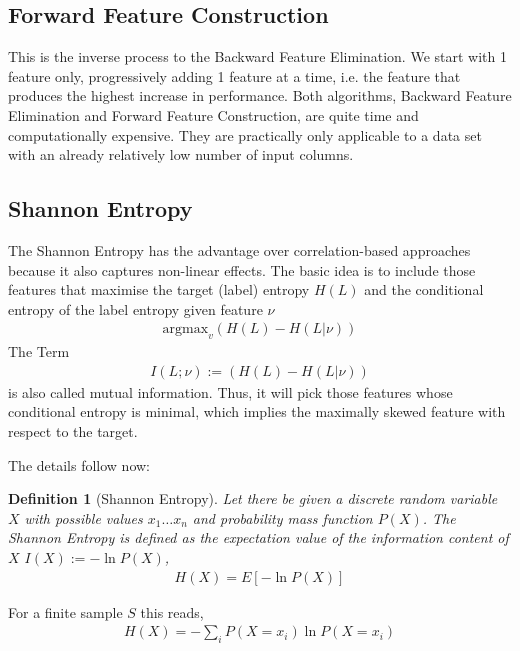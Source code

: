 \documentclass[10pt,a4paper]{article}
\newtheorem{definition}{Definition}
\begin{document}
\subsection*{Forward Feature Construction}
This is the inverse process to the Backward Feature Elimination. We start with 1 feature only, progressively adding 1 feature at a time, i.e. the feature that produces the highest increase in performance. Both algorithms, Backward Feature Elimination and Forward Feature Construction, are quite time and computationally expensive. They are practically only applicable to a data set with an already relatively low number of input columns.

\subsection*{Shannon Entropy}
The Shannon Entropy has the advantage over correlation-based approaches because it also captures non-linear effects. The basic idea is to include those features that maximise the target (label) entropy $H(L)$ and the conditional entropy of the  label entropy given feature $\nu$
\begin{align}
\text{argmax}_v\left( H(L) - H(L|\nu)\right)
\end{align}
The Term 
\begin{align}
I(L;\nu) :=\left( H(L) - H(L|\nu)\right)
\end{align}
is also called mutual information.
Thus, it will pick those features whose conditional entropy is minimal, which implies the maximally skewed feature with respect to the target. 


The details follow now:
\begin{definition}[Shannon Entropy]
Let there be given a discrete random variable $X$ with possible values ${x_1\dots x_n}$ and probability mass function $P(X)$. The Shannon Entropy is defined as the expectation value of the information content of $X$ $I(X):=-\ln P(X)$,
\begin{align}
H(X) = E[-\ln P(X)]
\end{align}
\end{definition}
For a finite sample $S$ this reads,
\begin{align}
H(X) = -\sum_i P (X=x_i) \ln P(X=x_i)
\end{align}
\end{document}
